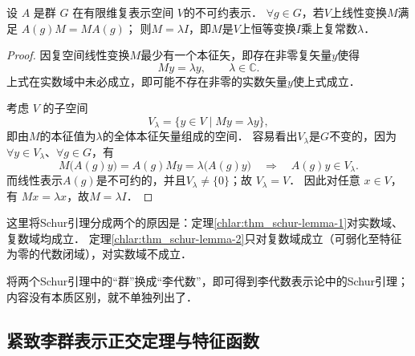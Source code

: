 \begin{theorem}\label{chlar:thm_schur-lemma-2}
	设 $A$ 是群 $G$ 在有限维复表示空间 $V$的不可约表示．
	$\forall g \in G $，若$V$上线性变换$M$满足	
	$A\left(g\right) M=M A\left(g\right)$；
	则$M=\lambda I$，即$M$是$V$上恒等变换$I$乘上复常数$\lambda$．
\end{theorem}
\begin{proof}
	因复空间线性变换$M$最少有一个本征矢，即存在非零复矢量$y$使得
	\begin{equation*}
		M y = \lambda y ,\qquad \lambda \in \mathbb{C}.
	\end{equation*}
	上式在实数域中未必成立，即可能不存在非零的实数矢量$y$使上式成立．
	
	考虑 $V$ 的子空间
	$$
	V_\lambda=\{y \in V \mid M y=\lambda y\},
	$$
	即由$M$的本征值为$\lambda$的全体本征矢量组成的空间．
	容易看出$V_\lambda$是$G$不变的，因为$\forall y \in V_\lambda$、$\forall g\in G$，有
	$$
	M\bigl(A(g) y\bigr)=A(g) M y= \lambda\bigl(A(g) y\bigr)
	\quad \Rightarrow \quad  A(g) y \in V_\lambda .
	$$
	而线性表示$A\left(g\right)$是不可约的，并且$V_\lambda\neq \{0\}$；故 $V_\lambda=V$．
	因此对任意 $x \in V$，有 $M x=\lambda x$，故$M=\lambda I $．
\end{proof}

这里将Schur引理分成两个的原因是：定理\ref{chlar:thm_schur-lemma-1}对实数域、复数域均成立．
定理\ref{chlar:thm_schur-lemma-2}只对复数域成立（可弱化至特征为零的代数闭域），对实数域不成立．

将两个Schur引理中的“群”换成“李代数”，即可得到李代数表示论中的Schur引理；
内容没有本质区别，就不单独列出了．


\subsection{紧致李群表示正交定理与特征函数}

